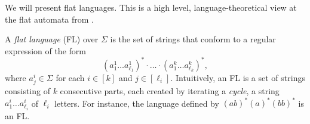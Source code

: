We will present flat languages. This is a high level, language-theoretical view at the flat automata from \cite{Parosh:20:PLDI}. 

A \emph{flat language} (FL)  over $\Sigma$
is the set of strings 
that conform to a regular expression of the form
$$
(a^1_1\ldots a^1_{\ell_1})^* \cdot \ldots \cdot (a^k_1\ldots a^k_{\ell_k})^*, 
$$
where $a^i_j \in \Sigma$ for each $i \in [k]$ and $j \in [\ell_i]$.
Intuitively, an FL is a set of strings consisting of $k$ consecutive parts, each created by iterating a \emph{cycle}, a string $a^i_1\ldots a^i_{\ell_i}$ of $\ell_i$ letters. 
For instance, the language defined by $(ab)^*(a)^*(bb)^*$ is an FL.




